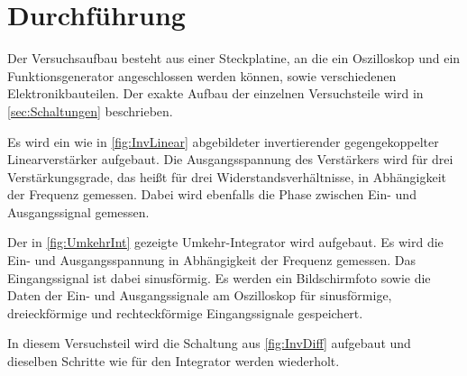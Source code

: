\section{Durchführung}
Der Versuchsaufbau besteht aus einer Steckplatine, an die ein Oszilloskop und ein Funktionsgenerator angeschlossen werden können, sowie verschiedenen Elektronikbauteilen. Der exakte Aufbau der einzelnen Versuchsteile wird in \autoref{sec:Schaltungen} beschrieben.


Es wird ein wie in \autoref{fig:InvLinear} abgebildeter invertierender gegengekoppelter Linearverstärker aufgebaut. Die Ausgangsspannung des Verstärkers wird für drei Verstärkungsgrade, das heißt für drei Widerstandsverhältnisse, in Abhängigkeit der Frequenz gemessen. %
Dabei wird ebenfalls die Phase zwischen Ein- und Ausgangssignal gemessen.


Der in \autoref{fig:UmkehrInt} gezeigte Umkehr-Integrator wird aufgebaut.
Es wird die Ein- und Ausgangsspannung in Abhängigkeit der Frequenz gemessen. Das Eingangssignal ist dabei sinusförmig.
Es werden ein Bildschirmfoto sowie die Daten der Ein- und Ausgangssignale am Oszilloskop für sinusförmige, dreieckförmige und rechteckförmige Eingangssignale gespeichert.



In diesem Versuchsteil wird die Schaltung aus \autoref{fig:InvDiff} aufgebaut und dieselben Schritte wie für den Integrator werden wiederholt.



